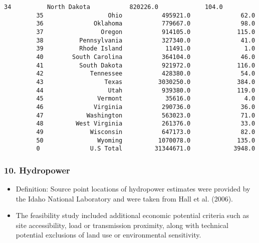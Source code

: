 \documentclass[11pt]{article}
\providecommand{\tightlist}{%
      \setlength{\itemsep}{0pt}\setlength{\parskip}{0pt}}
\begin{document}
\begin{Verbatim}[commandchars=\\\{\}]
         34          North Dakota           820226.0             104.0
         35                  Ohio           495921.0              62.0
         36              Oklahoma           779667.0              98.0
         37                Oregon           914105.0             115.0
         38          Pennsylvania           327340.0              41.0
         39          Rhode Island            11491.0               1.0
         40        South Carolina           364104.0              46.0
         41          South Dakota           921972.0             116.0
         42             Tennessee           428380.0              54.0
         43                 Texas          3030250.0             384.0
         44                  Utah           939380.0             119.0
         45               Vermont            35616.0               4.0
         46              Virginia           290736.0              36.0
         47            Washington           563023.0              71.0
         48         West Virginia           261376.0              33.0
         49             Wisconsin           647173.0              82.0
         50               Wyoming          1070078.0             135.0
         0              U.S Total         31344671.0            3948.0
\end{Verbatim}
            
    \subsubsection{10. Hydropower}\label{hydropower}

\begin{itemize}
\tightlist
\item
  Definition: Source point locations of hydropower estimates were
  provided by the Idaho National Laboratory and were taken from Hall et
  al. (2006).\\
\item
  The feasibility study included additional economic potential criteria
  such as site accessibility, load or transmission proximity, along with
  technical potential exclusions of land use or environmental
  sensitivity.
\end{itemize}
\end{document}
